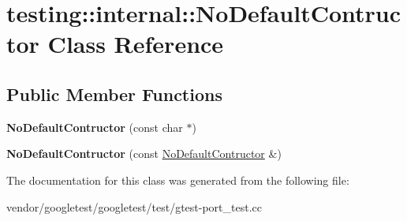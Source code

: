 \hypertarget{classtesting_1_1internal_1_1_no_default_contructor}{}\section{testing\+:\+:internal\+:\+:No\+Default\+Contructor Class Reference}
\label{classtesting_1_1internal_1_1_no_default_contructor}
\subsection*{Public Member Functions}
\begin{DoxyCompactItemize}
\item 
\mbox{\label{classtesting_1_1internal_1_1_no_default_contructor_a34c9cdf833476a9718141dcff931ba42}} 
{\bfseries No\+Default\+Contructor} (const char $\ast$)
\item 
\mbox{\label{classtesting_1_1internal_1_1_no_default_contructor_acba74b55a8c5341808ecb5b9318eaecf}} 
{\bfseries No\+Default\+Contructor} (const \hyperlink{classtesting_1_1internal_1_1_no_default_contructor}{No\+Default\+Contructor} \&)
\end{DoxyCompactItemize}


The documentation for this class was generated from the following file\+:\begin{DoxyCompactItemize}
\item 
vendor/googletest/googletest/test/gtest-\/port\+\_\+test.\+cc\end{DoxyCompactItemize}
